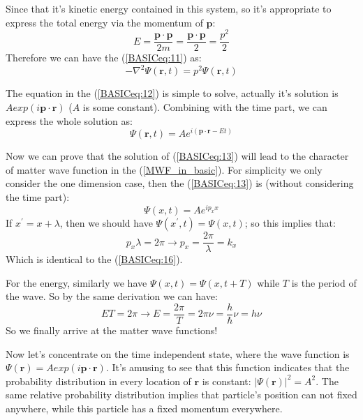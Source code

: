Since that it's kinetic energy contained in this system, so it's
appropriate to express the total energy via the momentum of $\bm{p}$:
\begin{equation}
  E = \frac{\bm{p} \cdot \bm{p}}{2m} = \frac{\bm{p} \cdot \bm{p}}{2} =
  \frac{p^{2}}{2}
\end{equation}
Therefore we can have the (\ref{BASICeq:11}) as:
\begin{equation}
  \label{BASICeq:12}
      -\nabla^{2}\Psi(\bm{r},t) = p^{2} \Psi(\bm{r},t)
\end{equation}

The equation in the (\ref{BASICeq:12}) is simple to solve, actually
it's solution is $A exp(i\bm{p}\cdot\bm{r})$ ($A$ is some
constant). Combining with the time part, we can express the whole
solution as:
\begin{equation}
  \label{BASICeq:13}
  \Psi(\bm{r},t) = Ae^{i(\bm{p}\cdot\bm{r} - Et)}
\end{equation}

Now we can prove that the solution of (\ref{BASICeq:13}) will lead to
the character of matter wave function in the (\ref{MWF_in_basic}). For
simplicity we only consider the one dimension case, then the
(\ref{BASICeq:13}) is (without considering the time part):
\begin{equation}
  \label{BASICeq:14}
    \Psi(x,t) = Ae^{ip_{x}x}
\end{equation}
If $x^{'} = x + \lambda$, then we should have $\Psi(x^{'},t) =
\Psi(x,t)$; so this implies that:
\begin{equation}
  \label{BASICeq:15}
  p_{x}\lambda = 2\pi \rightarrow  p_{x} = \frac{2\pi}{\lambda} = k_{x}
\end{equation}
Which is identical to the (\ref{BASICeq:16}).

For the energy, similarly we have $\Psi(x,t) = \Psi(x,t+T)$ while $T$
is the period of the wave. So by the same derivation we can have:
\begin{equation}
  \label{BASICeq:17}
  ET = 2\pi \rightarrow E = \frac{2\pi}{T} = 2\pi\nu =
  \frac{h}{\hbar}\nu = h\nu
\end{equation}
So we finally arrive at the matter wave functions!

Now let's concentrate on the time independent state, where the wave
function is $\Psi(\bm{r}) = Aexp ( i\bm{p}\cdot\bm{r})$. It's amusing
to see that this function indicates that the probability distribution
in every location of $\bm{r}$ is constant: $|\Psi(\bm{r})|^{2} =
A^{2}$. The same relative probability distribution implies that
particle's position can not fixed anywhere, while this particle has a
fixed momentum everywhere.


